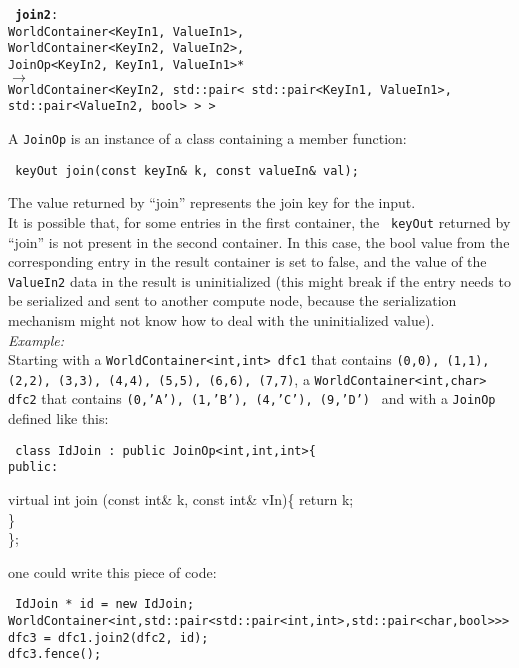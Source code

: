 \documentclass{article}
\begin{document}
\begin{itemize}
    {\tt 
    {\bf join2}:\\
    WorldContainer<KeyIn1, ValueIn1>,\\
    WorldContainer<KeyIn2, ValueIn2>,\\
    JoinOp<KeyIn2, KeyIn1, ValueIn1>*\\
    $\rightarrow$\\
    WorldContainer<KeyIn2, std::pair< std::pair<KeyIn1, ValueIn1>, std::pair<ValueIn2, bool> > >\\
    }

    A {\tt JoinOp} is an instance of a class containing a member function:

    {\tt
    keyOut join(const keyIn\& k, const valueIn\& val);\\
    }

    The value returned by ``join'' represents the join key for the input.\\

    It is possible that, for some entries in the first container, the {\tt
keyOut} returned by ``join'' is not present in the second container. In this
case, the bool value from the corresponding entry in the result container is
set to false, and the value of the {\tt ValueIn2} data in the result is
uninitialized (this might break if the entry needs to be serialized and sent
to another compute node, because the serialization mechanism might not know
how to deal with the uninitialized value).\\

   {\em Example:}\\

  Starting with a {\tt WorldContainer<int,int> dfc1} that contains 
  {\tt (0,0), (1,1), (2,2), (3,3), (4,4), (5,5), (6,6), (7,7)},
  a {\tt WorldContainer<int,char> dfc2} that contains
  {\tt (0,'A'), (1,'B'), (4,'C'), (9,'D') }
  and with a {\tt JoinOp} defined like this: 

  {\tt
  class IdJoin : public JoinOp<int,int,int>\{\\
  public:

  virtual int join (const int\& k, const int\& vIn)\{
      return k;\\
  \}\\
  \};\\
  }

  one could write this piece of code:

  {\tt
  IdJoin * id = new IdJoin;\\
  WorldContainer<int,std::pair<std::pair<int,int>,std::pair<char,bool>>> dfc3 = dfc1.join2(dfc2, id);\\
  dfc3.fence();\\
  }


\end{itemize}
\end{document}
